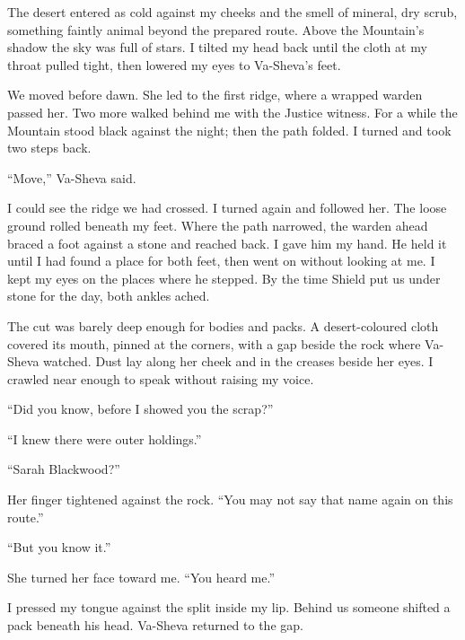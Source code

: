 \ornament

The desert entered as cold against my cheeks and the smell of mineral, dry scrub, something faintly animal beyond the prepared route. Above the Mountain's shadow the sky was full of stars. I tilted my head back until the cloth at my throat pulled tight, then lowered my eyes to Va-Sheva's feet.\par

We moved before dawn. She led to the first ridge, where a wrapped warden passed her. Two more walked behind me with the Justice witness. For a while the Mountain stood black against the night; then the path folded. I turned and took two steps back.\par

``Move,'' Va-Sheva said.\par

I could see the ridge we had crossed. I turned again and followed her. The loose ground rolled beneath my feet. Where the path narrowed, the warden ahead braced a foot against a stone and reached back. I gave him my hand. He held it until I had found a place for both feet, then went on without looking at me. I kept my eyes on the places where he stepped. By the time Shield put us under stone for the day, both ankles ached.\par

The cut was barely deep enough for bodies and packs. A desert-coloured cloth covered its mouth, pinned at the corners, with a gap beside the rock where Va-Sheva watched. Dust lay along her cheek and in the creases beside her eyes. I crawled near enough to speak without raising my voice.\par

``Did you know, before I showed you the scrap?''\par

``I knew there were outer holdings.''\par

``Sarah Blackwood?''\par

Her finger tightened against the rock. ``You may not say that name again on this route.''\par

``But you know it.''\par

She turned her face toward me. ``You heard me.''\par

I pressed my tongue against the split inside my lip. Behind us someone shifted a pack beneath his head. Va-Sheva returned to the gap.\par

